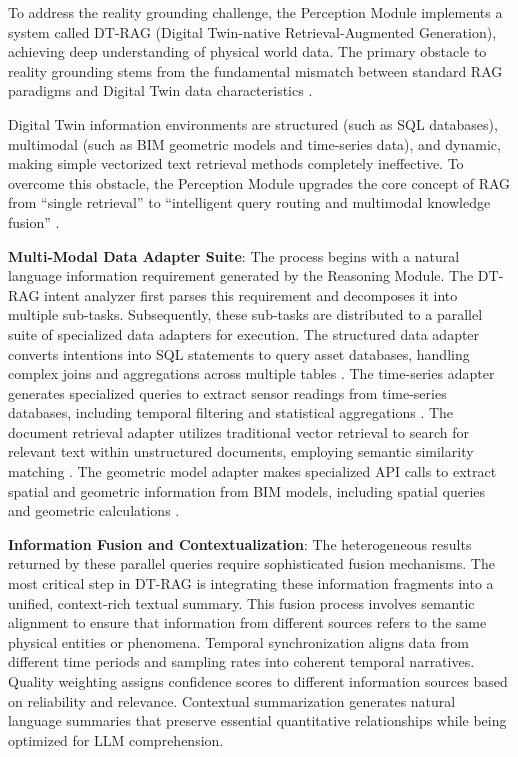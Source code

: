 To address the reality grounding challenge, the Perception Module implements a system called DT-RAG (Digital Twin-native Retrieval-Augmented Generation), achieving deep understanding of physical world data. The primary obstacle to reality grounding stems from the fundamental mismatch between standard RAG paradigms and Digital Twin data characteristics \cite{lewis2020retrieval}.

Digital Twin information environments are structured (such as SQL databases), multimodal (such as BIM geometric models and time-series data), and dynamic, making simple vectorized text retrieval methods completely ineffective. To overcome this obstacle, the Perception Module upgrades the core concept of RAG from ``single retrieval'' to ``intelligent query routing and multimodal knowledge fusion'' \cite{gao2023retrieval}.

\textbf{Multi-Modal Data Adapter Suite}: The process begins with a natural language information requirement generated by the Reasoning Module. The DT-RAG intent analyzer first parses this requirement and decomposes it into multiple sub-tasks. Subsequently, these sub-tasks are distributed to a parallel suite of specialized data adapters for execution. The structured data adapter converts intentions into SQL statements to query asset databases, handling complex joins and aggregations across multiple tables \cite{scholak2021duorat}. The time-series adapter generates specialized queries to extract sensor readings from time-series databases, including temporal filtering and statistical aggregations \cite{yue2022ts2vec}. The document retrieval adapter utilizes traditional vector retrieval to search for relevant text within unstructured documents, employing semantic similarity matching \cite{karpukhin2020dense}. The geometric model adapter makes specialized API calls to extract spatial and geometric information from BIM models, including spatial queries and geometric calculations \cite{boje2020towards}.

\textbf{Information Fusion and Contextualization}: The heterogeneous results returned by these parallel queries require sophisticated fusion mechanisms. The most critical step in DT-RAG is integrating these information fragments into a unified, context-rich textual summary. This fusion process involves semantic alignment to ensure that information from different sources refers to the same physical entities or phenomena. Temporal synchronization aligns data from different time periods and sampling rates into coherent temporal narratives. Quality weighting assigns confidence scores to different information sources based on reliability and relevance. Contextual summarization generates natural language summaries that preserve essential quantitative relationships while being optimized for LLM comprehension.

